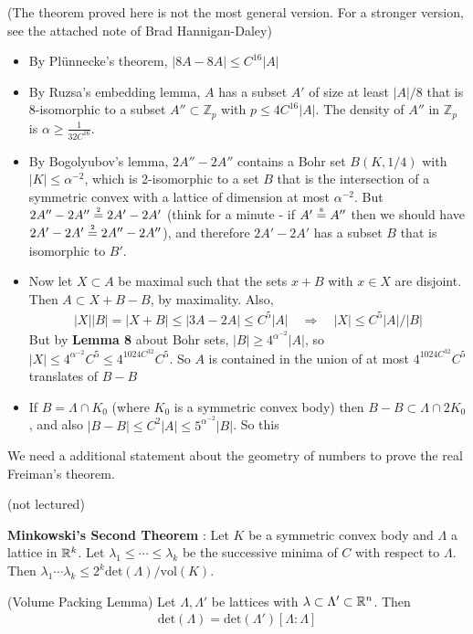 \documentclass[12pt,a4paper]{report}
\newcommand{\xeq}[1]{\stackrel{\mathclap{\normalfont\mbox{\tiny{#1}}}}{=}}
\begin{document}
(The theorem proved here is not the most general version. For a stronger version, see the attached note of Brad Hannigan-Daley)
\s

\begin{itemize}
\item By Pl\"{u}nnecke's theorem, $|8A - 8A| \leq C^{16}|A|$
\item By Ruzsa's embedding lemma, $A$ has a subset $A'$ of size at least $|A|/8$ that is 8-isomorphic to a subset $A'' \subset\mathbb{Z}_p$ with $p \leq 4C^{16}|A|$. The density of $A''$ in $\mathbb{Z}_p$ is $\alpha \geq \frac{1}{32C^{16}}$.
\item By Bogolyubov's lemma, $2A'' - 2A''$ contains a Bohr set $B(K,1/4)$ with $|K|\leq \alpha^{-2}$, which is 2-isomorphic to a set $B$ that is the intersection of a symmetric convex with a lattice of dimension at most $\alpha^{-2}$. But $2A'' - 2A'' \xeq{2} 2A' -2A'$ (think for a minute - if $A' \xeq{8} A''$ then we should have $2A'-2A' \xeq{2} 2A''-2A''$), and therefore $2A' - 2A'$ has a subset $B$ that is isomorphic to $B'$. 
\item Now let $X \subset A$ be maximal such that the sets $x + B$ with $x\in X$ are disjoint. Then $A \subset X + B-B$, by maximality. Also,
\begin{align*}
|X||B| = |X+B| \leq |3A-2A| \leq C^5 |A| \quad \Rightarrow \quad  |X|\leq C^5 |A|/|B|
\end{align*}
But by \textbf{Lemma 8} about Bohr sets, $|B| \geq 4^{\alpha^{-2}} |A|$, so $|X| \leq 4^{\alpha^{-2}}C^5 \leq 4^{1024 C^{32}} C^5$. So $A$ is contained in the union of at most $4^{1024 C^{32}} C^5$ translates of $B-B$
\item If $B = \Lambda \cap K_0$ (where $K_0$ is a symmetric convex body) then $B-B \subset \Lambda \cap 2K_0$, and also $|B-B|\leq C^2 |A| \leq 5^{\alpha^{-2}}|B|$. So this 
\end{itemize}

We need a additional statement about the geometry of numbers to prove the real Freiman's theorem.
\s

\digression

(not lectured)
\s

\textbf{Minkowski's Second Theorem} : Let $K$ be a symmetric convex body and $\Lambda$ a lattice in $\mathbb{R}^k$. Let $\lambda_1 \leq \cdots \leq \lambda_k$ be the successive minima of $C$ with respect to $\Lambda$. Then $\lambda_1 \cdots \lambda_k \leq 2^k \text{det}(\Lambda)/\text{vol}(K)$.
\s

\lem (Volume Packing Lemma) Let $\Lambda, \Lambda'$ be lattices with $\lambda \subset \Lambda' \subset \mathbb{R}^n$. Then
\begin{align*}
\text{det}(\Lambda) = \text{det}(\Lambda')[\Lambda : \Lambda]
\end{align*}
\s
\end{document}
